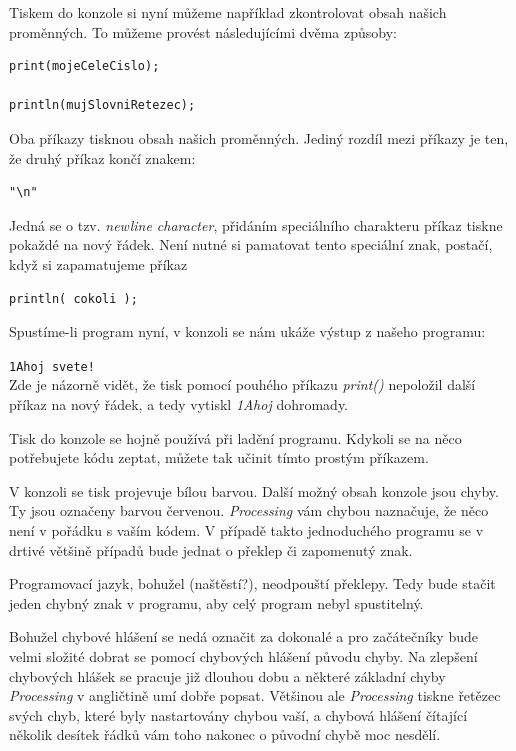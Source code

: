 \documentclass[10pt,twoside=true,open=right,cleardoublepage=empty,chapterprefix=true]{scrbook}
\newcommand{\vyraz}[1]{\textit{\gls{#1}}\index{#1}\label{#1}}
\newcommand{\console}[1]{\texttt{\footnotesize #1}}
\begin{document}
Tiskem do konzole si nyní můžeme například zkontrolovat obsah našich proměnných. To můžeme provést následujícími dvěma způsoby:


\begin{lstlisting}
print(mojeCeleCislo);

println(mujSlovniRetezec);
\end{lstlisting}

Oba příkazy tisknou obsah našich proměnných. Jediný rozdíl mezi příkazy je ten, že druhý příkaz končí znakem:
 
\begin{lstlisting}
"\n"
\end{lstlisting}

Jedná se o tzv. {\em newline character}, přidáním speciálního charakteru příkaz tiskne pokaždé na nový řádek. Není nutné si pamatovat tento speciální znak, postačí, když si zapamatujeme příkaz 

\begin{lstlisting}
println( cokoli );

\end{lstlisting}

Spustíme-li program nyní, v konzoli se nám ukáže výstup z našeho programu:

\console{1Ahoj svete!}\\

Zde je názorně vidět, že tisk pomocí pouhého příkazu \vyraz{print()} nepoložil další příkaz na nový řádek, a tedy vytiskl {\em 1Ahoj} dohromady.

Tisk do konzole se hojně používá při ladění programu. Kdykoli se na něco potřebujete kódu zeptat, můžete tak učinit tímto prostým příkazem.

V konzoli se tisk projevuje bílou barvou. Další možný obsah konzole jsou chyby. Ty jsou označeny barvou červenou. {\em Processing} vám chybou naznačuje, že něco není v pořádku s vaším kódem. V případě takto jednoduchého programu se v drtivé většině případů bude jednat o překlep či zapomenutý znak.

Programovací jazyk, bohužel (naštěstí?), neodpouští překlepy. Tedy bude stačit jeden chybný znak v programu, aby celý program nebyl spustitelný.

Bohužel chybové hlášení se nedá označit za dokonalé a pro začátečníky bude velmi složité dobrat se pomocí chybových hlášení původu chyby. Na zlepšení chybových hlášek se pracuje již dlouhou dobu a některé základní chyby {\em Processing} v angličtině umí dobře popsat. Většinou ale {\em Processing} tiskne řetězec svých chyb, které byly nastartovány chybou vaší, a chybová hlášení čítající několik desítek řádků vám toho nakonec o původní chybě moc nesdělí.
\end{document}
